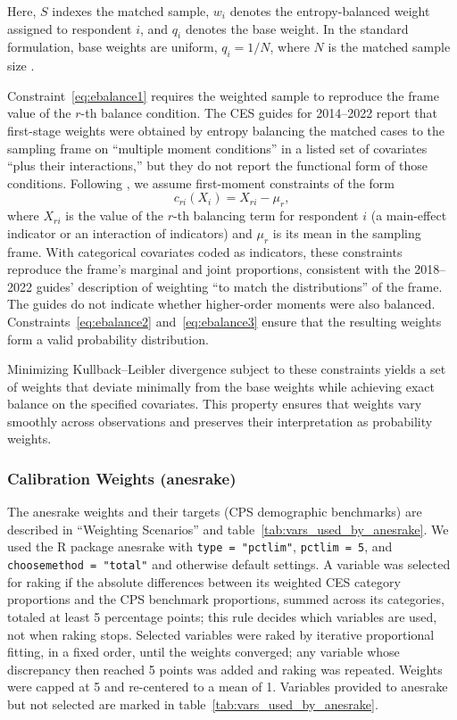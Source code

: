 \documentclass[12pt]{article}
\begin{document}
Here, \( S \) indexes the matched sample, \( w_i \) denotes the entropy-balanced weight assigned to respondent \( i \), and \( q_i \) denotes the base weight. In the standard formulation, base weights are uniform, \( q_i = 1/N \), where \( N \) is the matched sample size \parencite{hainmueller_entropy_2012}.

Constraint~\eqref{eq:ebalance1} requires the weighted sample to reproduce the frame value of the $r$-th balance condition. The CES guides for 2014--2022 report that first-stage weights were obtained by entropy balancing the matched cases to the sampling frame on ``multiple moment conditions'' in a listed set of covariates ``plus their interactions,'' but they do not report the functional form of those conditions. Following \textcite{hainmueller_entropy_2012}, we assume first-moment constraints of the form
\[
c_{ri}(X_i) = X_{ri} - \mu_r ,
\]
where $X_{ri}$ is the value of the $r$-th balancing term for respondent $i$ (a main-effect indicator or an interaction of indicators) and $\mu_r$ is its mean in the sampling frame. With categorical covariates coded as indicators, these constraints reproduce the frame's marginal and joint proportions, consistent with the 2018--2022 guides' description of weighting ``to match the distributions'' of the frame. The guides do not indicate whether higher-order moments were also balanced. Constraints~\eqref{eq:ebalance2} and~\eqref{eq:ebalance3} ensure that the resulting weights form a valid probability distribution.

Minimizing Kullback--Leibler divergence subject to these constraints yields a set of weights that deviate minimally from the base weights while achieving exact balance on the specified covariates. This property ensures that weights vary smoothly across observations and preserves their interpretation as probability weights.

\subsubsection*{Calibration Weights (anesrake)}
The anesrake weights and their targets (CPS demographic benchmarks) are described in ``Weighting Scenarios'' and table~\ref{tab:vars_used_by_anesrake}. We used the R package anesrake with \texttt{type = "pctlim"}, \texttt{pctlim = 5}, and \texttt{choosemethod = "total"} and otherwise default settings. A variable was selected for raking if the absolute differences between its weighted CES category proportions and the CPS benchmark proportions, summed across its categories, totaled at least 5 percentage points; this rule decides which variables are used, not when raking stops. Selected variables were raked by iterative proportional fitting, in a fixed order, until the weights converged; any variable whose discrepancy then reached 5 points was added and raking was repeated. Weights were capped at 5 and re-centered to a mean of 1. Variables provided to anesrake but not selected are marked in table~\ref{tab:vars_used_by_anesrake}.
\end{document}
